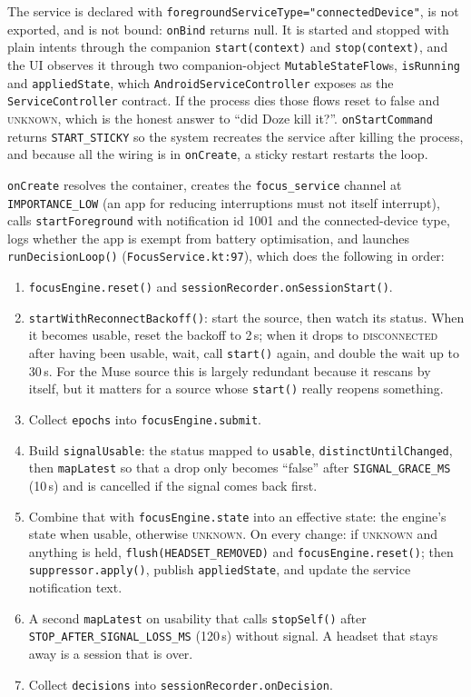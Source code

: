 \documentclass[10pt,a4paper]{article}
\newcommand{\file}[1]{\texttt{\small #1}}          %
\newcommand{\code}[1]{\texttt{#1}}                  %
\newcommand{\state}[1]{\textsc{\small #1}}          %
\begin{document}
The service is declared with \code{foregroundServiceType="connectedDevice"}, is not exported, and
is not bound: \code{onBind} returns null. It is started and stopped with plain intents through the
companion \code{start(context)} and \code{stop(context)}, and the UI observes it through two
companion-object \code{MutableStateFlow}s, \code{isRunning} and \code{appliedState}, which
\code{AndroidServiceController} exposes as the \code{ServiceController} contract. If the process
dies those flows reset to false and \state{unknown}, which is the honest answer to ``did Doze kill
it?''. \code{onStartCommand} returns \code{START\_STICKY} so the system recreates the service after
killing the process, and because all the wiring is in \code{onCreate}, a sticky restart restarts
the loop.

\code{onCreate} resolves the container, creates the \code{focus\_service} channel at
\code{IMPORTANCE\_LOW} (an app for reducing interruptions must not itself interrupt), calls
\code{startForeground} with notification id 1001 and the connected-device type, logs whether the
app is exempt from battery optimisation, and launches \code{runDecisionLoop()}
(\file{FocusService.kt:97}), which does the following in order:

\begin{enumerate}
\item \code{focusEngine.reset()} and \code{sessionRecorder.onSessionStart()}.
\item \code{startWithReconnectBackoff()}: start the source, then watch its status. When it becomes
  usable, reset the backoff to 2\,s; when it drops to \textsc{disconnected} after having been
  usable, wait, call \code{start()} again, and double the wait up to 30\,s. For the Muse source
  this is largely redundant because it rescans by itself, but it matters for a source whose
  \code{start()} really reopens something.
\item Collect \code{epochs} into \code{focusEngine.submit}.
\item Build \code{signalUsable}: the status mapped to \code{usable}, \code{distinctUntilChanged},
  then \code{mapLatest} so that a drop only becomes ``false'' after \code{SIGNAL\_GRACE\_MS}
  (10\,s) and is cancelled if the signal comes back first.
\item Combine that with \code{focusEngine.state} into an effective state: the engine's state when
  usable, otherwise \state{unknown}. On every change: if \state{unknown} and anything is held,
  \code{flush(HEADSET\_REMOVED)} and \code{focusEngine.reset()}; then \code{suppressor.apply()},
  publish \code{appliedState}, and update the service notification text.
\item A second \code{mapLatest} on usability that calls \code{stopSelf()} after
  \code{STOP\_AFTER\_SIGNAL\_LOSS\_MS} (120\,s) without signal. A headset that stays away is a
  session that is over.
\item Collect \code{decisions} into \code{sessionRecorder.onDecision}.
\end{enumerate}
\end{document}
